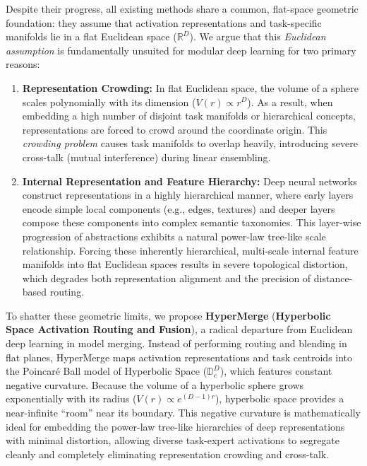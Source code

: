 Despite their progress, all existing methods share a common, flat-space geometric foundation: they assume that activation representations and task-specific manifolds lie in a flat Euclidean space ($\mathbb{R}^D$). We argue that this \emph{Euclidean assumption} is fundamentally unsuited for modular deep learning for two primary reasons:
\begin{enumerate}
    \item \textbf{Representation Crowding:} In flat Euclidean space, the volume of a sphere scales polynomially with its dimension ($V(r) \propto r^D$). As a result, when embedding a high number of disjoint task manifolds or hierarchical concepts, representations are forced to crowd around the coordinate origin. This \emph{crowding problem} causes task manifolds to overlap heavily, introducing severe cross-talk (mutual interference) during linear ensembling.
    \item \textbf{Internal Representation and Feature Hierarchy:} Deep neural networks construct representations in a highly hierarchical manner, where early layers encode simple local components (e.g., edges, textures) and deeper layers compose these components into complex semantic taxonomies. This layer-wise progression of abstractions exhibits a natural power-law tree-like scale relationship. Forcing these inherently hierarchical, multi-scale internal feature manifolds into flat Euclidean spaces results in severe topological distortion, which degrades both representation alignment and the precision of distance-based routing.
\end{enumerate}

To shatter these geometric limits, we propose \textbf{HyperMerge} (\textbf{Hyperbolic Space Activation Routing and Fusion}), a radical departure from Euclidean deep learning in model merging. Instead of performing routing and blending in flat planes, HyperMerge maps activation representations and task centroids into the Poincaré Ball model of Hyperbolic Space ($\mathbb{D}_c^D$), which features constant negative curvature. Because the volume of a hyperbolic sphere grows exponentially with its radius ($V(r) \propto e^{(D-1)r}$), hyperbolic space provides a near-infinite ``room'' near its boundary. This negative curvature is mathematically ideal for embedding the power-law tree-like hierarchies of deep representations with minimal distortion, allowing diverse task-expert activations to segregate cleanly and completely eliminating representation crowding and cross-talk.

